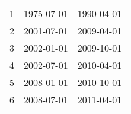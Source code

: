 % 
\begin{tabular}{ccc}
  \hline
  \hline
1 & 1975-07-01 & 1990-04-01 \\ 
  2 & 2001-07-01 & 2009-04-01 \\ 
  3 & 2002-01-01 & 2009-10-01 \\ 
  4 & 2002-07-01 & 2010-04-01 \\ 
  5 & 2008-01-01 & 2010-10-01 \\ 
  6 & 2008-07-01 & 2011-04-01 \\ 
   \hline
\end{tabular}
